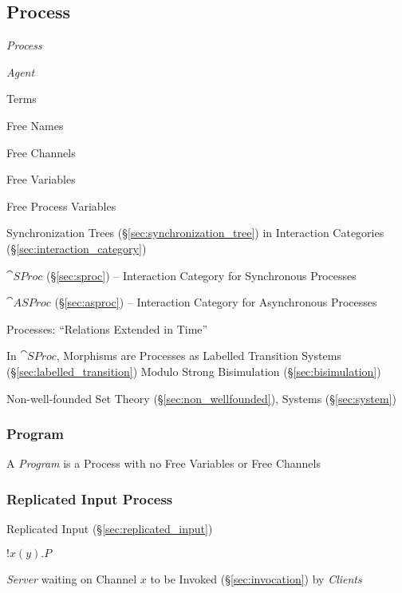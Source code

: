 \subsection{Process}\label{sec:process}

\emph{Process}

\emph{Agent}

Terms

Free Names

Free Channels

Free Variables

Free Process Variables


\asterism


Synchronization Trees (\S\ref{sec:synchronization_tree}) in
Interaction Categories (\S\ref{sec:interaction_category})

$\cat{SProc}$ (\S\ref{sec:sproc}) -- Interaction Category for
Synchronous Processes

$\cat{ASProc}$ (\S\ref{sec:asproc}) -- Interaction Category for
Asynchronous Processes

Processes: ``Relations Extended in Time''

In $\cat{SProc}$, Morphisms are Processes as Labelled Transition
Systems (\S\ref{sec:labelled_transition}) Modulo Strong Bisimulation
(\S\ref{sec:bisimulation})

Non-well-founded Set Theory (\S\ref{sec:non_wellfounded}), Systems
(\S\ref{sec:system})



\subsubsection{Program}\label{sec:program}

A \emph{Program} is a Process with no Free Variables or Free Channels



\subsubsection{Replicated Input Process}
\label{sec:replicated_input_process}

Replicated Input (\S\ref{sec:replicated_input})

$!x(y).P$

\emph{Server} waiting on Channel $x$ to be Invoked
(\S\ref{sec:invocation}) by \emph{Clients}



